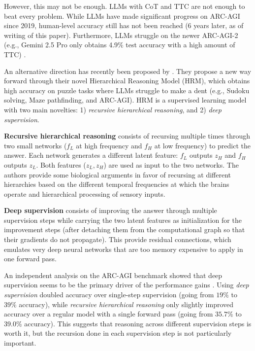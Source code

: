 \documentclass{article}
\theoremstyle{plain}
\theoremstyle{definition}
\theoremstyle{remark}
\begin{document}
\clearpage

However, this may not be enough. LLMs with CoT and TTC are not enough to beat every problem. While LLMs have made significant progress on ARC-AGI \citep{chollet2019measure} since 2019, human-level accuracy still has not been reached (6 years later, as of writing of this paper). Furthermore, LLMs struggle on the newer ARC-AGI-2 (e.g., Gemini 2.5 Pro only obtains 4.9\% test accuracy with a high amount of TTC) \citep{chollet2025arc,arc_prize}.

An alternative direction has recently been proposed by \citet{wang2025hierarchical}. They propose a new way forward through their novel Hierarchical Reasoning Model (HRM), which obtains high accuracy on puzzle tasks where LLMs struggle to make a dent (e.g., Sudoku solving, Maze pathfinding, and ARC-AGI). HRM is a supervised learning model with two main novelties: 1) \emph{recursive hierarchical reasoning}, and 2) \emph{deep supervision}. 

\textbf{Recursive hierarchical reasoning} consists of recursing multiple times through two small networks ($f_L$ at high frequency and $f_H$ at low frequency) to predict the answer. Each network generates a different latent feature: $f_L$ outputs $z_H$ and $f_H$ outputs $z_L$. Both features ($z_L,z_H$) are used as input to the two networks. The authors provide some biological arguments in favor of recursing at different hierarchies based on the different temporal frequencies at which the brains operate and hierarchical processing of sensory inputs. 

\textbf{Deep supervision} consists of improving the answer through multiple supervision steps while carrying the two latent features as initialization for the improvement steps (after detaching them from the computational graph so that their gradients do not propagate). This provide residual connections, which emulates very deep neural networks that are too memory expensive to apply in one forward pass.

An independent analysis on the ARC-AGI benchmark showed that deep supervision seems to be the primary driver of the performance gains \citep{arc_hrm}. Using \emph{deep supervision} doubled accuracy over single-step supervision (going from $19\%$ to $39\%$ accuracy), while \emph{recursive hierarchical reasoning} only slightly improved accuracy over a regular model with a single forward pass (going from $35.7\%$ to $39.0\%$ accuracy). This suggests that reasoning across different supervision steps is worth it, but the recursion done in each supervision step is not particularly important. 
\end{document}

